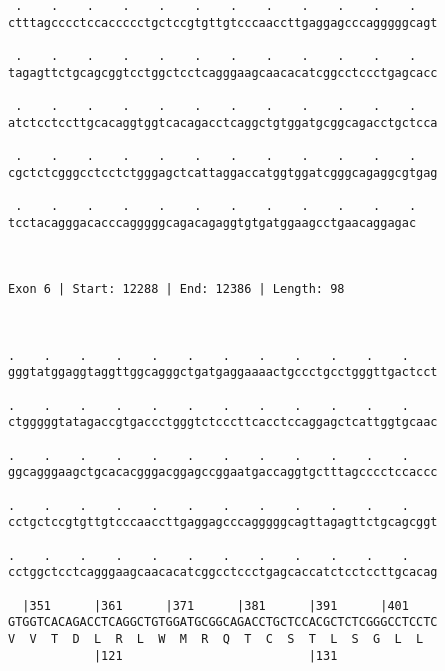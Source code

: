 \documentclass{article}
\begin{document}
\begin{Verbatim}
 .    .    .    .    .    .    .    .    .    .    .    .   
ctttagcccctccaccccctgctccgtgttgtcccaaccttgaggagcccagggggcagt
                                                            
 .    .    .    .    .    .    .    .    .    .    .    .   
tagagttctgcagcggtcctggctcctcagggaagcaacacatcggcctccctgagcacc
                                                            
 .    .    .    .    .    .    .    .    .    .    .    .   
atctcctccttgcacaggtggtcacagacctcaggctgtggatgcggcagacctgctcca
                                                            
 .    .    .    .    .    .    .    .    .    .    .    .   
cgctctcgggcctcctctgggagctcattaggaccatggtggatcgggcagaggcgtgag
                                                            
 .    .    .    .    .    .    .    .    .    .    .    .
tcctacagggacacccagggggcagacagaggtgtgatggaagcctgaacaggagac
                                                         
                                                         
 
Exon 6 | Start: 12288 | End: 12386 | Length: 98



.    .    .    .    .    .    .    .    .    .    .    .    
gggtatggaggtaggttggcagggctgatgaggaaaactgccctgcctgggttgactcct
                                                            
.    .    .    .    .    .    .    .    .    .    .    .    
ctgggggtatagaccgtgaccctgggtctcccttcacctccaggagctcattggtgcaac
                                                            
.    .    .    .    .    .    .    .    .    .    .    .    
ggcagggaagctgcacacgggacggagccggaatgaccaggtgctttagcccctccaccc
                                                            
.    .    .    .    .    .    .    .    .    .    .    .    
cctgctccgtgttgtcccaaccttgaggagcccagggggcagttagagttctgcagcggt
                                                            
.    .    .    .    .    .    .    .    .    .    .    .    
cctggctcctcagggaagcaacacatcggcctccctgagcaccatctcctccttgcacag
                                                            
  |351      |361      |371      |381      |391      |401    
GTGGTCACAGACCTCAGGCTGTGGATGCGGCAGACCTGCTCCACGCTCTCGGGCCTCCTC
V  V  T  D  L  R  L  W  M  R  Q  T  C  S  T  L  S  G  L  L  
            |121                          |131              
  

\end{Verbatim}
\end{document}
